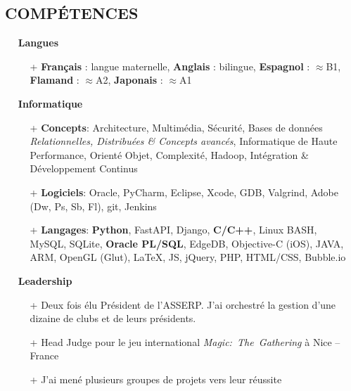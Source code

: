 \documentclass{res}
\begin{document}
\begin{resume}
\pagebreak

\section{\faLayerGroup~COMP\'ETENCES}
	\begin{itemize}
		\item[] \faLanguage~\textbf{Langues}
		\begin{itemize}
                 \item[+]  \textbf{Fran\c{c}ais} : langue maternelle, \textbf{Anglais} : bilingue, \textbf{Espagnol} : $\approx$B1, \textbf{Flamand} : $\approx$A2, \textbf{Japonais} : $\approx$A1
		\end{itemize}
	\end{itemize}

	\begin{itemize}
	\item[] \faLaptopCode~\textbf{Informatique}
		\begin{itemize}
                  \item[+] \textbf{Concepts}: Architecture, Multim\'edia, S\'ecurit\'e, Bases de donn\'ees \textit{Relationnelles, Distribu\'ees \& Concepts avanc\'es}, Informatique de Haute Performance, Orient\'e Objet, Complexit\'e, Hadoop, Int\'egration \& D\'eveloppement Continus
                  \item[+] \textbf{Logiciels}: Oracle, PyCharm, Eclipse, Xcode, GDB, Valgrind, Adobe (Dw, Ps, Sb, Fl), git, Jenkins
                  \item[+] \textbf{Langages}: \textbf{Python}, FastAPI, Django, \textbf{C/C++}, Linux BASH, MySQL, SQLite, \textbf{Oracle PL/SQL}, EdgeDB, Objective-C (iOS), JAVA, ARM, OpenGL (Glut), \LaTeX{}, JS, jQuery, PHP, HTML/CSS, Bubble.io
		\end{itemize}
	\end{itemize}

	\begin{itemize}
	\item[] \faHandshake[regular]~\textbf{Leadership}
		\begin{itemize}
			      \item[+] Deux fois \'elu Pr\'esident de l'ASSERP. J'ai orchestr\'e la gestion d'une dizaine de clubs et de leurs pr\'esidents.
                  \item[+] Head Judge pour le jeu international \textit{Magic:~The~Gathering} \`a Nice -- France
                  \item[+] J'ai men\'e plusieurs groupes de projets vers leur r\'eussite
		\end{itemize}
	\end{itemize}


\end{resume}
\end{document}
